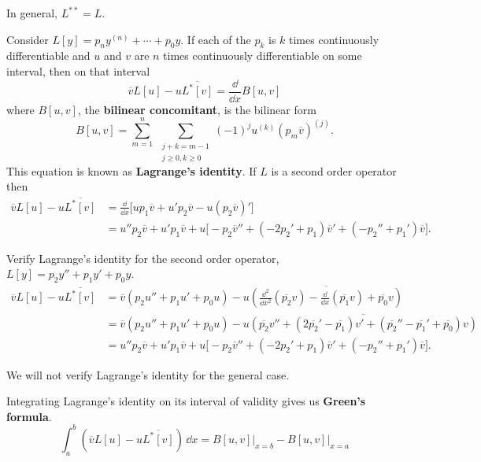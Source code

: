 In general, $L^{**} = L$.



Consider $L[y] = p_n y^{(n)} + \cdots + p_0 y$.  If each of the
$p_k$ is $k$ times continuously differentiable and $u$ and $v$ are 
$n$ times continuously differentiable on some interval, then on that
interval
\[ \overline{v}L[u] - u \overline{L^*[v]} = \frac{\dd}{\dd x} B[u,v] \]
where $B[u,v]$, the \textbf{bilinear concomitant},  is the bilinear form
\[ B[u,v] = \sum_{m=1}^n \ \sum_{\substack{ j+k=m-1 \\ j\geq 0, k \geq 0 }}
(-1)^j u^{(k)} (p_m \overline{v})^{(j)}.\]
This equation is known as \textbf{Lagrange's identity}.
If $L$ is a second order operator then
\begin{align*}
  \overline{v} L[u] - u \overline{L^*[v]} &= \frac{\dd}{\dd x} \big[ u p_1 \overline{v} + u' p_2 \overline{v} 
  - u (p_2 \overline{v})' \big] \\
  &= u'' p_2 \overline{v} + u' p_1 \overline{v} + u \big[ -p_2 \overline{v}'' + (-2 p_2' 
  + p_1) \overline{v}' + (-p_2'' + p_1')\overline{v} \big].
\end{align*}




\begin{Example}
  Verify Lagrange's identity for the second order operator, $L[y] = p_2 y''
  + p_1 y' + p_0 y$.
  \begin{align*}
    \overline{v} L[u] - u \overline{L^*[v]}
    &= \overline{v} (p_2 u'' + p_1 u' + p_0 u) - u \overline{\left( \frac{\dd^2}{\dd x^2}
        (\overline{p_2} v) - \frac{\dd}{\dd x}(\overline{p_1} v) + \overline{p_0} v\right)}\\
    &= \overline{v} (p_2 u'' + p_1 u' + p_0 u) - u \overline{( \overline{p_2} v'' + 
      (2\overline{p_2}' - \overline{p_1}) v' + (\overline{p_2}'' - \overline{p_1}' + \overline{p_0}
      ) v )} \\
    &= u'' p_2 \overline{v} + u' p_1 \overline{v} + u \big[ -p_2 \overline{v}'' 
    + (-2 p_2' + p_1)
    \overline{v}' + (-p_2'' + p_1')\overline{v}\big].
  \end{align*}
\end{Example}


We will not verify Lagrange's identity for the general case.

Integrating Lagrange's identity on its interval of validity
gives us \textbf{Green's formula}.
\[ \int_a^b \left( \overline{v} L[u] - u \overline{L^*[v]} \right)\,\dd x = 
B[u,v] \big|_{x=b} - B[u,v] \big|_{x=a} \]




